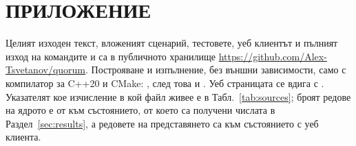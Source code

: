 \section*{ПРИЛОЖЕНИЕ}
\label{sec:appendix}

Целият изходен текст, вложеният сценарий, тестовете, уеб клиентът и пълният
изход на командите  и  са в публичното
хранилище \url{https://github.com/Alex-Tsvetanov/quorum}. Построяване и
изпълнение, без външни зависимости, само с компилатор за C++20 и CMake:
, след това
 и . Уеб страницата се вдига с
. Указателят кое изчисление в кой файл живее е в
Табл.~\ref{tab:sources}; броят редове на ядрото е от  към състоянието,
от което са получени числата в Раздел~\ref{sec:results}, а редовете на
представянето са към състоянието с уеб клиента.

